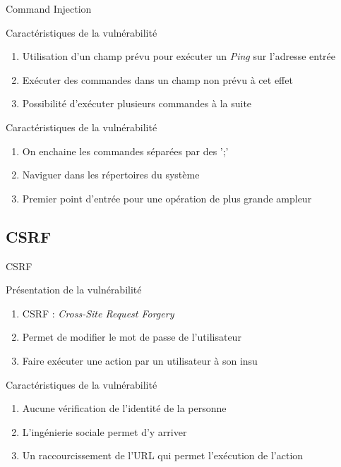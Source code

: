 \documentclass[8pt]{beamer}
\begin{document}
\begin{frame}{Command Injection}

\begin{block}{Caractéristiques de la vulnérabilité}
	\begin{enumerate}[\ding{217}]
		\item Utilisation d'un champ prévu pour exécuter un \textit{Ping} sur l'adresse entrée
		\item Exécuter des commandes dans un champ non prévu à cet effet
		\item Possibilité d'exécuter plusieurs commandes à la suite
	\end{enumerate}
\end{block}

\begin{block}{Caractéristiques de la vulnérabilité}
	\begin{enumerate}[\ding{217}]
		\item On enchaine les commandes séparées par des ';'
		\item Naviguer dans les répertoires du système
		\item Premier point d'entrée pour une opération de plus grande ampleur
	\end{enumerate}
\end{block}

\end{frame}

\subsection{CSRF}

\begin{frame}{CSRF}

\begin{block}{Présentation de la vulnérabilité}
	\begin{enumerate}[\ding{217}]
		\item CSRF :  \textit{Cross-Site Request Forgery}
		\item Permet de modifier le mot de passe de l'utilisateur
		\item Faire exécuter une action par un utilisateur à son insu
	\end{enumerate}
\end{block}

\begin{block}{Caractéristiques de la vulnérabilité}
        \begin{enumerate}[\ding{217}]
                \item Aucune vérification de l'identité de la personne
		\item L'ingénierie sociale permet d'y arriver
		\item Un raccourcissement de l'URL qui permet l'exécution de l'action
	\end{enumerate}
\end{block}

\end{frame}
\end{document}
